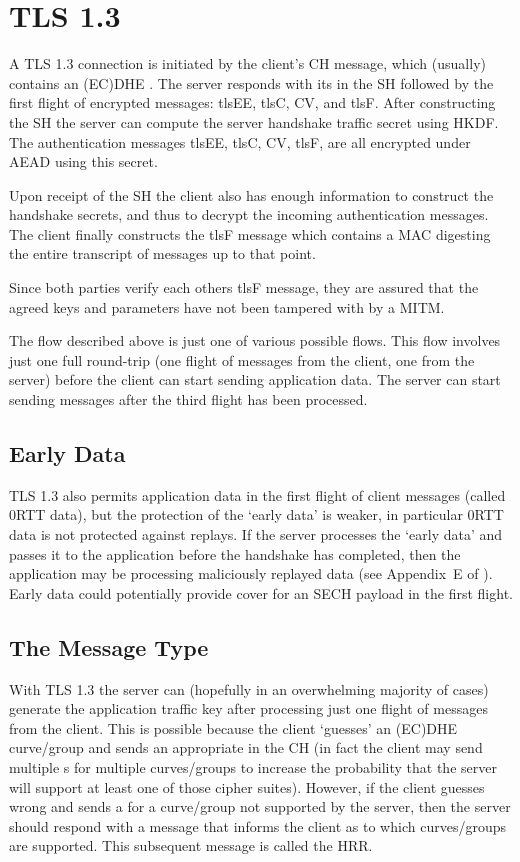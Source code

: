 \section{TLS 1.3}
A \ac{TLS} 1.3 connection is initiated by the client's \ac{CH} message, which (usually)
contains an (\ac{EC})\ac{DHE} .
The server responds with its  in the \ac{SH} followed by the first flight of encrypted messages: \ac{tlsEE}, \ac{tlsC}, \ac{CV}, and \ac{tlsF}.
After constructing the \ac{SH} the server can compute the server handshake traffic secret using \ac{HKDF}. The authentication messages \ac{tlsEE}, \ac{tlsC}, \ac{CV}, \ac{tlsF}, are all encrypted under \ac{AEAD} using this secret.

Upon receipt of the \ac{SH} the client also has enough information to construct the handshake secrets, and thus to decrypt the incoming authentication messages.
The client finally constructs the \ac{tlsF} message which contains a \ac{MAC} digesting the entire transcript of messages up to that point.

Since both parties verify each others \ac{tlsF} message, they are assured that the agreed keys and parameters have not been tampered with by a \ac{MITM}.

The flow described above is just one of various possible flows.
This flow involves just one full round-trip (one flight of messages from the client, one from the server) before the client can start sending application data.
The server can start sending messages after the third flight has been processed.

\subsection{Early Data}
\ac{TLS} 1.3 also permits application data in the first flight of client messages (called 0\ac{RTT} data),
but the protection of the `early data' is weaker,
in particular 0\ac{RTT} data is not protected against replays.
If the server processes the `early data' and passes it to the application
before the handshake has completed, then the application
may be processing maliciously replayed data (see Appendix~E of \cite{esni}).
Early data could potentially provide cover for an \ac{SECH} payload in the first flight.

\subsection{The  Message Type}
With TLS 1.3 the server can (hopefully in an overwhelming majority of cases) generate the application traffic key after processing just one flight of messages from the client. This is possible because the client `guesses' an (\ac{EC})\ac{DHE} curve/group and sends an appropriate  in the \ac{CH} (in fact the client may send multiple s for multiple curves/groups to increase the probability that the server will support at least one of those cipher suites).
However, if the client guesses wrong and sends a  for a curve/group not supported by the server,
then the server should respond with a message that informs the client as to which curves/groups are supported.
This subsequent message is called the \ac{HRR}.

